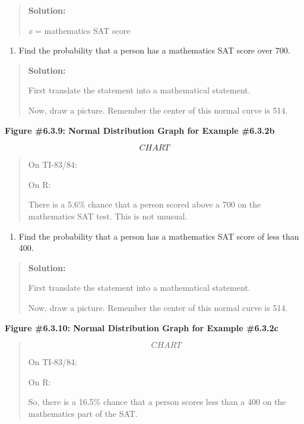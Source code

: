 \documentclass[]{book}
\providecommand{\tightlist}{%
  \setlength{\itemsep}{0pt}\setlength{\parskip}{0pt}}
\begin{document}
\begin{quote}
\textbf{Solution:}

\emph{x} = mathematics SAT score
\end{quote}

\begin{enumerate}
\def\labelenumi{\alph{enumi}.}
\setcounter{enumi}{1}
\tightlist
\item
  Find the probability that a person has a mathematics SAT score
  over 700.
\end{enumerate}

\begin{quote}
\textbf{Solution:}

First translate the statement into a mathematical statement.

Now, draw a picture. Remember the center of this normal curve is 514.
\end{quote}

\textbf{Figure \#6.3.9: Normal Distribution Graph for Example \#6.3.2b}

{\[CHART\]}

\begin{quote}
On TI-83/84:

On R:

There is a 5.6\% chance that a person scored above a 700 on the
mathematics SAT test. This is not unusual.
\end{quote}

\begin{enumerate}
\def\labelenumi{\alph{enumi}.}
\setcounter{enumi}{2}
\tightlist
\item
  Find the probability that a person has a mathematics SAT score of
  less than 400.
\end{enumerate}

\begin{quote}
\textbf{Solution:}

First translate the statement into a mathematical statement.

Now, draw a picture. Remember the center of this normal curve is 514.
\end{quote}

\textbf{Figure \#6.3.10: Normal Distribution Graph for Example \#6.3.2c}

\begin{quote}
{\[CHART\]}

On TI-83/84:

On R:

So, there is a 16.5\% chance that a person scores less than a 400 on
the mathematics part of the SAT.
\end{quote}
\end{document}
